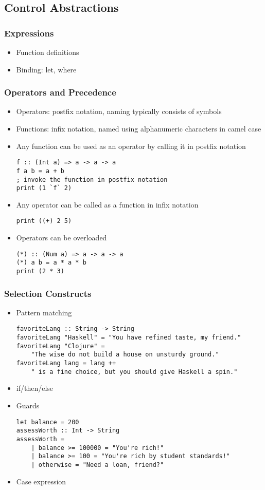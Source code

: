 \documentclass[titlepage,12pt]{article}
\newcommand{\bi}{\begin{itemize}}
\newcommand{\ei}{\end{itemize}}
\begin{document}
\subsection{Control Abstractions}
\subsubsection{Expressions}
\bi
    \item Function definitions
    \item Binding: let, where
\ei

\subsubsection{Operators and Precedence}
\bi
    \item Operators: postfix notation, naming typically consists of symbols
    \item Functions: infix notation, named using alphanumeric characters in camel case
    \item Any function can be used as an operator by calling it in postfix notation
\begin{verbatim}
f :: (Int a) => a -> a -> a
f a b = a + b
; invoke the function in postfix notation
print (1 `f` 2)
\end{verbatim}
    \item Any operator can be called as a function in infix notation
\begin{verbatim}
print ((+) 2 5)
\end{verbatim}
    \item Operators can be overloaded
\begin{verbatim}
(*) :: (Num a) => a -> a -> a
(*) a b = a * a * b
print (2 * 3)
\end{verbatim}
\ei

\subsubsection{Selection Constructs}
\bi
    \item Pattern matching
\begin{verbatim}
favoriteLang :: String -> String
favoriteLang "Haskell" = "You have refined taste, my friend."
favoriteLang "Clojure" = 
    "The wise do not build a house on unsturdy ground."
favoriteLang lang = lang ++ 
    " is a fine choice, but you should give Haskell a spin."
\end{verbatim}
    \item if/then/else
    \item Guards
\begin{verbatim}
let balance = 200
assessWorth :: Int -> String
assessWorth =
    | balance >= 100000 = "You're rich!"
    | balance >= 100 = "You're rich by student standards!"
    | otherwise = "Need a loan, friend?"
\end{verbatim}
    \item Case expression
\ei
\end{document}
